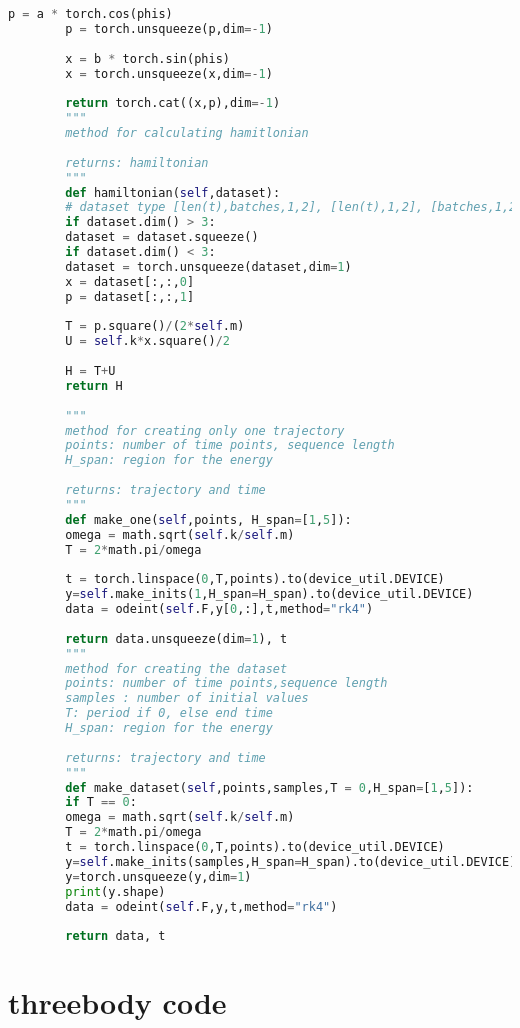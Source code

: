\begin{appendices}
\begin{lstlisting}[language=Python, caption={ocilator.py}]
		p = a * torch.cos(phis)
		p = torch.unsqueeze(p,dim=-1)
		
		x = b * torch.sin(phis)
		x = torch.unsqueeze(x,dim=-1)
		
		return torch.cat((x,p),dim=-1)
		"""
		method for calculating hamitlonian
		
		returns: hamiltonian
		"""
		def hamiltonian(self,dataset):
		# dataset type [len(t),batches,1,2], [len(t),1,2], [batches,1,2]
		if dataset.dim() > 3:
		dataset = dataset.squeeze()
		if dataset.dim() < 3:
		dataset = torch.unsqueeze(dataset,dim=1)
		x = dataset[:,:,0]
		p = dataset[:,:,1]
		
		T = p.square()/(2*self.m)
		U = self.k*x.square()/2
		
		H = T+U
		return H
		
		"""
		method for creating only one trajectory
		points: number of time points, sequence length
		H_span: region for the energy
		
		returns: trajectory and time
		"""
		def make_one(self,points, H_span=[1,5]):
		omega = math.sqrt(self.k/self.m)
		T = 2*math.pi/omega
		
		t = torch.linspace(0,T,points).to(device_util.DEVICE)
		y=self.make_inits(1,H_span=H_span).to(device_util.DEVICE)
		data = odeint(self.F,y[0,:],t,method="rk4")
		
		return data.unsqueeze(dim=1), t
		"""
		method for creating the dataset 
		points: number of time points,sequence length
		samples : number of initial values
		T: period if 0, else end time
		H_span: region for the energy
		
		returns: trajectory and time
		"""
		def make_dataset(self,points,samples,T = 0,H_span=[1,5]):
		if T == 0:
		omega = math.sqrt(self.k/self.m)
		T = 2*math.pi/omega
		t = torch.linspace(0,T,points).to(device_util.DEVICE)
		y=self.make_inits(samples,H_span=H_span).to(device_util.DEVICE)
		y=torch.unsqueeze(y,dim=1)
		print(y.shape)
		data = odeint(self.F,y,t,method="rk4")
		
		return data, t
	\end{lstlisting}
	
	
	\section{threebody code}

	
\end{appendices}